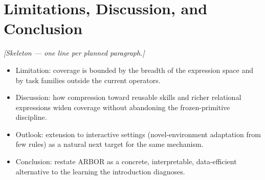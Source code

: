 \documentclass[letterpaper]{article} %
\begin{document}
\section{Limitations, Discussion, and Conclusion}
\emph{[Skeleton --- one line per planned paragraph.]}
\begin{itemize}
\item Limitation: coverage is bounded by the breadth of the expression space and
by task families outside the current operators.
\item Discussion: how compression toward reusable skills and richer relational
expressions widen coverage without abandoning the frozen-primitive discipline.
\item Outlook: extension to interactive settings (novel-environment adaptation
from few rules) as a natural next target for the same mechanism.
\item Conclusion: restate ARBOR as a concrete, interpretable, data-efficient
alternative to the learning the introduction diagnoses.
\end{itemize}


\end{document}
